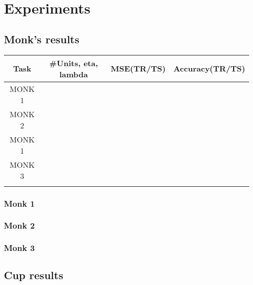 \section{Experiments}

\subsection{Monk's results}
\begin{table}[h]
\begin{tabular}{|c|c|c|c|}
\hline
\textbf{Task} & \textbf{\#Units, eta, lambda} & \multicolumn{1}{l|}{\textbf{MSE(TR/TS)}} & \textbf{Accuracy(TR/TS)} \\ \hline
MONK 1        &                               &                                          &                          \\ \hline
MONK 2        &                               &                                          &                          \\ \hline
MONK 1        &                               &                                          &                          \\ \hline
MONK 3        &                               &                                          &                          \\ \hline
              &                               &                                          &                          \\ \hline
\end{tabular}
\end{table}
\subsubsection{Monk 1}

\subsubsection{Monk 2}

\subsubsection{Monk 3}

\subsection{Cup results}